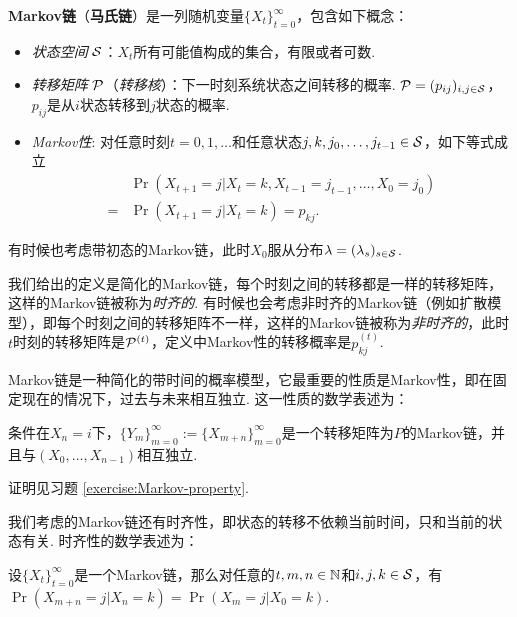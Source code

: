 \begin{definition}[Markov链]
\textbf{Markov链}（\textbf{马氏链}）是一列随机变量$\{X_t\}_{t=0}^{\infty}$，包含如下概念：
\begin{itemize}
	\item \textit{状态空间} $\mathcal S$：$X_t$所有可能值构成的集合，有限或者可数.
	\item \textit{转移矩阵} $\mathcal P$（\textit{转移核}）：下一时刻系统状态之间转移的概率. $\mathcal P=(p_{ij})_{i,j\in \mathcal S}$，$p_{ij}$是从$i$状态转移到$j$状态的概率.
	\item \textit{Markov性}: 对任意时刻$t=0,1,\dots$和任意状态$j,k,j_0,\dots,j_{t-1}\in \mathcal S$，如下等式成立
		\begin{align*}
		   &\Pr(X_{t+1}=j| X_t=k,X_{t-1}=j_{t-1},\dots,X_0=j_0)\\
           =&\Pr(X_{t+1}=j| X_{t}=k)=p_{kj}.
		\end{align*}
    \end{itemize}
    有时候也考虑带初态的Markov链，此时$X_0$服从分布$\lambda=(\lambda_s)_{s\in \mathcal S}$.
\end{definition}
我们给出的定义是简化的Markov链，每个时刻之间的转移都是一样的转移矩阵，这样的Markov链被称为\textit{时齐的}. 有时候也会考虑非时齐的Markov链（例如扩散模型），即每个时刻之间的转移矩阵不一样，这样的Markov链被称为\textit{非时齐的}，此时$t$时刻的转移矩阵是$\mathcal P^{(t)}$，定义中Markov性的转移概率是$p_{kj}^{(t)}$.

Markov链是一种简化的带时间的概率模型，它最重要的性质是Markov性，即在固定现在的情况下，过去与未来相互独立. 这一性质的数学表述为：
\begin{proposition}[Markov性]\label{prop:markov}
条件在$X_n=i$下，$\{Y_m\}_{m=0}^{\infty}:=\{X_{m+n}\}_{m=0}^{\infty}$是一个转移矩阵为$P$的Markov链，并且与$(X_0,\dots,X_{n-1})$相互独立.
\end{proposition}
证明见习题 \ref{exercise:Markov-property}.

我们考虑的Markov链还有时齐性，即状态的转移不依赖当前时间，只和当前的状态有关. 时齐性的数学表述为：
\begin{proposition}
    设$\{X_t\}_{t=0}^{\infty}$是一个Markov链，那么对任意的$t,m,n\in \mathbb{N}$和$i,j,k\in \mathcal S$，有
    $\Pr(X_{m+n}=j| X_{n}=k)=\Pr(X_{m}=j| X_{0}=k)$.
\end{proposition}

